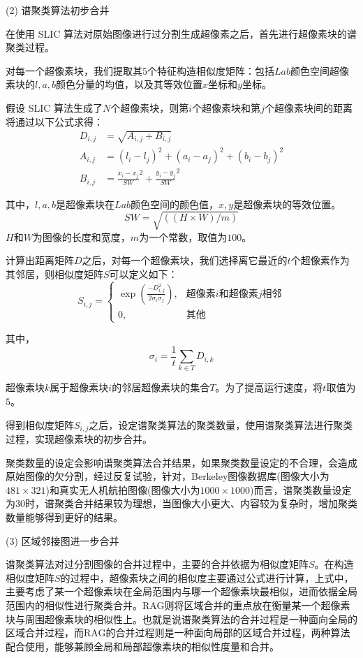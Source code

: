 (2) 谱聚类算法初步合并 

在使用 SLIC 算法对原始图像进行过分割生成超像素之后，首先进行超像素块的谱聚类过程。

对每一个超像素块，我们提取其$5$个特征构造相似度矩阵：包括$Lab$颜色空间超像素块的$l,a,b$颜色分量的均值，以及其等效位置$ x $坐标和$ y $坐标。

假设 SLIC 算法生成了$ N $个超像素块，则第$ i $个超像素块和第$ j $个超像素块间的距离将通过以下公式求得：
\[\begin{split}
D_{i,j}&=\sqrt{A_{i,j}+B_{i,j}} \\
A_{i,j}&=(l_i-l_j)^2+(a_i-a_j)^2+(b_i-b_j)^2 \\
B_{i,j}&=\frac{x_i-x_j}{SW}^2+\frac{y_i-y_j}{SW}^2
\end{split}\]

其中，$l,a,b$是超像素块在$Lab$颜色空间的颜色值，$x,y$是超像素块的等效位置。
$$
SW=\sqrt{((H\times W)/m)}
$$
$H$和$W$为图像的长度和宽度，$m$为一个常数，取值为$100$。

计算出距离矩阵$D$之后，对每一个超像素块，我们选择离它最近的$t$个超像素作为其邻居，则相似度矩阵$S$可以定义如下：
\begin{displaymath}
S_{i,j} = \left\{ \begin{array}{ll}

\exp{(\frac{-D^2_{i,j}}{2\sigma_i\sigma_j})}, & \textrm{超像素$i$和超像素$j$相邻}\\
0, & \textrm{其他}

\end{array} \right.
\end{displaymath}

其中，
$$
\sigma_i=\frac{1}{t}\sum_{k\in T}D_{i,k}
$$

超像素块$ k $属于超像素块$ i $的邻居超像素块的集合$T$。为了提高运行速度，将$t$取值为$5$。

得到相似度矩阵$S_{i,j}$之后，设定谱聚类算法的聚类数量，使用谱聚类算法进行聚类过程，实现超像素块的初步合并。

聚类数量的设定会影响谱聚类算法合并结果，如果聚类数量设定的不合理，会造成原始图像的欠分割，经过反复试验，针对，Berkeley图像数据库(图像大小为$481\times321$)和真实无人机航拍图像(图像大小为$1000\times1000$)而言，谱聚类数量设定为$30$时，谱聚类合并结果较为理想，当图像大小更大、内容较为复杂时，增加聚类数量能够得到更好的结果。

(3) 区域邻接图进一步合并

谱聚类算法对过分割图像的合并过程中，主要的合并依据为相似度矩阵$S$。在构造相似度矩阵$S$的过程中，超像素块之间的相似度主要通过公式进行计算，上式中，主要考虑了某一个超像素块在全局范围内与哪一个超像素块最相似，进而依据全局范围内的相似性进行聚类合并。RAG则将区域合并的重点放在衡量某一个超像素块与周围超像素块的相似性上。也就是说谱聚类算法的合并过程是一种面向全局的区域合并过程，而RAG的合并过程则是一种面向局部的区域合并过程，两种算法配合使用，能够兼顾全局和局部超像素块的相似性度量和合并。

